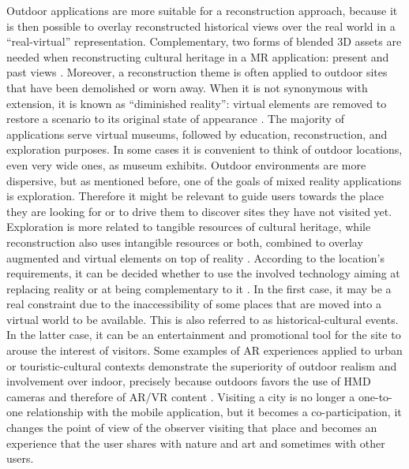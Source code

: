 Outdoor applications are more suitable for a reconstruction approach, because it is then possible to overlay reconstructed historical views over the real world in a “real-virtual” representation. Complementary, two forms of blended 3D assets are needed when reconstructing cultural heritage in a MR application: present and past views \cite{bekele_survey_2018}. Moreover, a reconstruction theme is often applied to outdoor sites that have been demolished or worn away. When it is not synonymous with extension, it is known as “diminished reality”: virtual elements are removed to restore a scenario to its original state of appearance \cite{honkanen_enhancing_2018}. 
The majority of applications serve virtual museums, followed by education, reconstruction, and exploration purposes.
In some cases it is convenient to think of outdoor locations, even very wide ones, as museum exhibits. Outdoor environments are more dispersive, but as mentioned before, one of the goals of mixed reality applications is exploration. Therefore it might be relevant to guide users towards the place they are looking for \cite{jenny_enhancing_2017} or to drive them to discover sites they have not visited yet. Exploration is more related to tangible resources of cultural heritage, while reconstruction also uses intangible resources or both, combined to overlay augmented and virtual elements on top of reality \cite{bekele_survey_2018}. According to the location's requirements, it can be decided whether to use the involved technology aiming at replacing reality or at being complementary to it \cite{racz_virtual_2019}. In the first case, it may be a real constraint due to the inaccessibility of some places that are moved into a virtual world to be available. This is also referred to as historical-cultural events. In the latter case, it can be an entertainment and promotional tool for the site to arouse the interest of visitors.
Some examples of AR experiences applied to urban or touristic-cultural contexts demonstrate the superiority of outdoor realism and involvement over indoor, precisely because outdoors favors the use of HMD cameras and therefore of AR/VR content \cite{iacoviello_holocities_2020}. Visiting a city is no longer a one-to-one relationship with the mobile application, but it becomes a co-participation, it changes the point of view of the observer visiting that place and becomes an experience that the user shares with nature and art and sometimes with other users.
